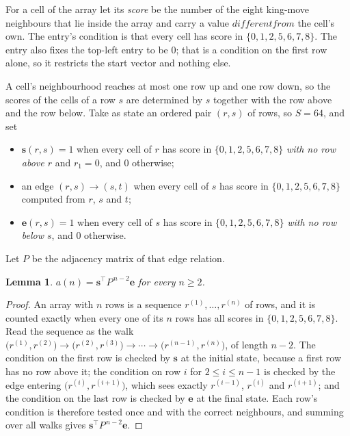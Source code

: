 \documentclass[11pt,a4paper]{article}
\theoremstyle{plain}
\newtheorem{lemma}[theorem]{Lemma}
\theoremstyle{definition}
\begin{document}
For a cell of the array let its \emph{score} be the number of the eight king-move neighbours that lie inside
the array and carry a value $different from$ the cell's own. The entry's condition is that every cell
has score in $\{0,1,2,5,6,7,8\}$. The entry also fixes the top-left entry to be $0$; that is a condition on the first row alone, so it restricts the start vector and nothing else.

A cell's neighbourhood reaches at most one row up and one row down, so the scores of the
cells of a row $s$ are determined by $s$ together with the row above and the row below.
Take as state an ordered pair $(r,s)$ of rows, so $S=64$, and set
\begin{itemize}
\item $\mathbf{s}(r,s)=1$ when every cell of $r$ has score in $\{0,1,2,5,6,7,8\}$ \emph{with no row
above $r$} and $r_1=0$, and $0$ otherwise;
\item an edge $(r,s)\to(s,t)$ when every cell of $s$ has score in $\{0,1,2,5,6,7,8\}$ computed from
$r$, $s$ and $t$;
\item $\mathbf{e}(r,s)=1$ when every cell of $s$ has score in $\{0,1,2,5,6,7,8\}$ \emph{with no row
below $s$}, and $0$ otherwise.
\end{itemize}
Let $P$ be the adjacency matrix of that edge relation.

\begin{lemma}\label{lem:walk}
$a(n)=\mathbf{s}^{\!\top}P^{\,n-2}\mathbf{e}$ for every $n\ge2$.
\end{lemma}

\begin{proof}
An array with $n$ rows is a sequence $r^{(1)},\dots,r^{(n)}$ of rows, and it is counted
exactly when every one of its $n$ rows has all scores in $\{0,1,2,5,6,7,8\}$. Read the sequence as the
walk $\bigl(r^{(1)},r^{(2)}\bigr)\to\bigl(r^{(2)},r^{(3)}\bigr)\to\cdots\to
\bigl(r^{(n-1)},r^{(n)}\bigr)$, of length $n-2$. The condition on the first row is
checked by $\mathbf{s}$ at the initial state, because a first row has no row above it; the
condition on row $i$ for $2\le i\le n-1$ is checked by the edge entering
$\bigl(r^{(i)},r^{(i+1)}\bigr)$, which sees exactly $r^{(i-1)}$, $r^{(i)}$ and
$r^{(i+1)}$; and the condition on the last row is checked by $\mathbf{e}$ at the final
state. Each row's condition is therefore tested once and with the correct neighbours, and
summing over all walks gives $\mathbf{s}^{\!\top}P^{\,n-2}\mathbf{e}$.
\end{proof}
\end{document}

